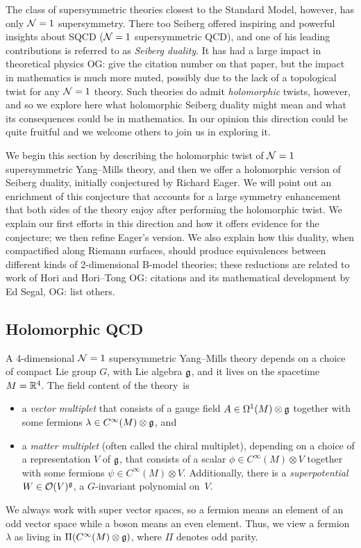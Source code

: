 \documentclass[11pt]{amsart}
\def\owen#1{{\textcolor{violet!50!black}{OG: {#1}}}}
\begin{document}
The class of supersymmetric theories closest to the Standard Model, however, has only $\mathcal N=1$ supersymmetry.
There too Seiberg offered inspiring and powerful insights about SQCD ($\mathcal N=1$ supersymmetric QCD),
and one of his leading contributions is referred to as {\em Seiberg duality}.
It has had a large impact in theoretical physics \owen{give the citation number on that paper},
but the impact in mathematics is much more muted,
possibly due to the lack of a topological twist for any $\mathcal N=1$ theory.
Such theories do admit {\em holomorphic} twists, however, 
and so we explore here what holomorphic Seiberg duality might mean and what its consequences could be in mathematics.
In our opinion this direction could be quite fruitful and we welcome others to join us in exploring it.

We begin this section by describing the holomorphic twist of $\mathcal N=1$ supersymmetric Yang--Mills theory,
and then we offer a holomorphic version of Seiberg duality, 
initially conjectured by Richard Eager.
We will point out an enrichment of this conjecture that accounts for a large symmetry enhancement that both sides of the theory enjoy after performing the holomorphic twist.
We explain our first efforts in this direction and how it offers evidence for the conjecture;
we then refine Eager's version.
We also explain how this duality, when compactified along Riemann surfaces,
should produce equivalences between different kinds of 2-dimensional B-model theories;
these reductions are related to work of Hori and Hori--Tong \owen{citations} and its mathematical development by Ed Segal, \owen{list others}.

\subsection{Holomorphic QCD}

A 4-dimensional $\mathcal N=1$ supersymmetric Yang--Mills theory depends on a choice of compact Lie group $G$, with Lie algebra $\mathfrak g$, 
and it lives on  the spacetime $M=\mathbb R^4$.
The field content of the theory~is
\begin{itemize}
\item a {\it vector multiplet} that consists of a gauge field $A \in \Omega^1(M) \otimes \mathfrak g $ together with some fermions $\lambda \in C^\infty(M) \otimes \mathfrak g$, and
\item a {\it matter multiplet} (often called the chiral multiplet), depending on a choice of a representation $V$ of $\mathfrak g$, that consists of a scalar $\phi \in C^\infty(M) \otimes V$ together with some fermions $\psi \in C^\infty(M) \otimes V$. 
Additionally, there is a {\it superpotential} $W \in \mathcal O(V)^\mathfrak g$, a $G$-invariant polynomial on~$V$. 
\end{itemize}
We always work with super vector spaces, so a fermion means an element of an odd vector space while a boson means an even element.
Thus, we view a fermion $\lambda$ as living in $\Pi (C^\infty(M) \otimes \mathfrak g)$,
where $\Pi$ denotes odd parity.
\end{document}
